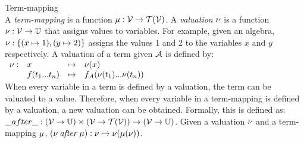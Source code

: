 \vspace{10px}
\begin{definition} Term-mapping \\
A \textit{term-mapping} is a function $\mu:\mathcal{V} \rightarrow \mathcal{T}(\mathcal{V})$. A \textit{valuation} $\nu$ is a function $\nu:\mathcal{V} \rightarrow \mathbb{U}$ that assigns values to variables. For example, given an algebra, $\nu:\{(x \mapsto 1), (y \mapsto 2)\}$ assigns the values 1 and 2 to the variables $x$ and $y$ respectively.
A valuation of a term given $\mathcal{A}$ is defined by:
\vspace{5px}\\
$\begin{array}{llcl}
\nu: & x & \mapsto & \nu(x)\\
 & f(t_1 ... t_n) & \mapsto & f_{\mathcal{A}}(\nu(t_1) ... \nu(t_n))
 \end{array}$
\vspace{5px}\\
When every variable in a term is defined by a valuation, the term can be valuated to a value. Therefore, when every variable in a term-mapping is defined by a valuation, a new valuation can be obtained. Formally, this is defined as: $\_{after}\_: (\mathcal{V} \rightarrow \mathbb{U}) \times (\mathcal{V} \rightarrow \mathcal{T}(\mathcal{V})) \rightarrow (\mathcal{V} \rightarrow \mathbb{U})$. Given a valuation $\nu$ and a term-mapping $\mu$, ($\nu\:\mathit{after}\:\mu): \nu \mapsto \nu(\mu(\nu))$.
\end{definition}